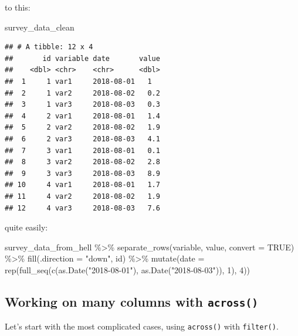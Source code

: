 \documentclass[
]{article}
\newenvironment{Shaded}{\begin{snugshade}}{\end{snugshade}}
\newcommand{\AttributeTok}[1]{\textcolor[rgb]{0.77,0.63,0.00}{#1}}
\newcommand{\ConstantTok}[1]{\textcolor[rgb]{0.00,0.00,0.00}{#1}}
\newcommand{\DecValTok}[1]{\textcolor[rgb]{0.00,0.00,0.81}{#1}}
\newcommand{\FunctionTok}[1]{\textcolor[rgb]{0.00,0.00,0.00}{#1}}
\newcommand{\NormalTok}[1]{#1}
\newcommand{\SpecialCharTok}[1]{\textcolor[rgb]{0.00,0.00,0.00}{#1}}
\newcommand{\StringTok}[1]{\textcolor[rgb]{0.31,0.60,0.02}{#1}}
\begin{document}
to this:

\begin{Shaded}
\begin{Highlighting}[]
\NormalTok{survey\_data\_clean}
\end{Highlighting}
\end{Shaded}

\begin{verbatim}
## # A tibble: 12 x 4
##       id variable date       value
##    <dbl> <chr>    <chr>      <dbl>
##  1     1 var1     2018-08-01   1  
##  2     1 var2     2018-08-02   0.2
##  3     1 var3     2018-08-03   0.3
##  4     2 var1     2018-08-01   1.4
##  5     2 var2     2018-08-02   1.9
##  6     2 var3     2018-08-03   4.1
##  7     3 var1     2018-08-01   0.1
##  8     3 var2     2018-08-02   2.8
##  9     3 var3     2018-08-03   8.9
## 10     4 var1     2018-08-01   1.7
## 11     4 var2     2018-08-02   1.9
## 12     4 var3     2018-08-03   7.6
\end{verbatim}

quite easily:

\begin{Shaded}
\begin{Highlighting}[]
\NormalTok{survey\_data\_from\_hell }\SpecialCharTok{\%\textgreater{}\%}
    \FunctionTok{separate\_rows}\NormalTok{(variable, value, }\AttributeTok{convert =} \ConstantTok{TRUE}\NormalTok{) }\SpecialCharTok{\%\textgreater{}\%}
    \FunctionTok{fill}\NormalTok{(}\AttributeTok{.direction =} \StringTok{"down"}\NormalTok{, id) }\SpecialCharTok{\%\textgreater{}\%}
    \FunctionTok{mutate}\NormalTok{(}\AttributeTok{date =} \FunctionTok{rep}\NormalTok{(}\FunctionTok{full\_seq}\NormalTok{(}\FunctionTok{c}\NormalTok{(}\FunctionTok{as.Date}\NormalTok{(}\StringTok{"2018{-}08{-}01"}\NormalTok{), }\FunctionTok{as.Date}\NormalTok{(}\StringTok{"2018{-}08{-}03"}\NormalTok{)), }\DecValTok{1}\NormalTok{), }\DecValTok{4}\NormalTok{))}
\end{Highlighting}
\end{Shaded}

\hypertarget{working-on-many-columns-with-across}{%
\subsection{\texorpdfstring{Working on many columns with \texttt{across()}}{Working on many columns with across()}}\label{working-on-many-columns-with-across}}

Let's start with the most complicated cases, using \texttt{across()} with \texttt{filter()}.
\end{document}
